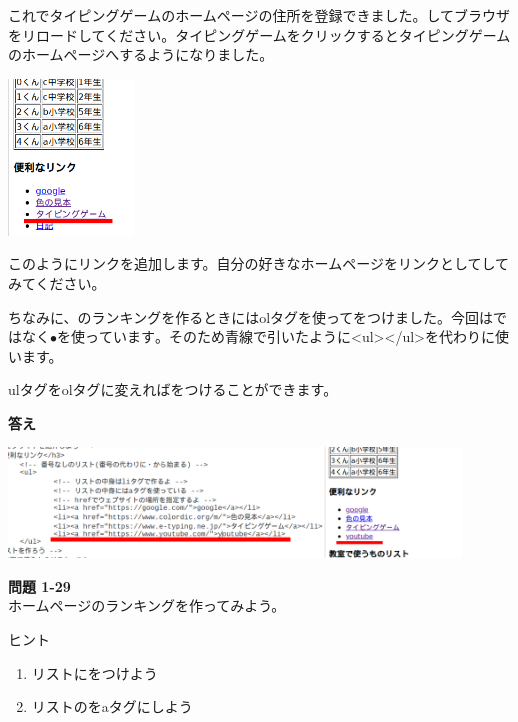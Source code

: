 \bigskip
\flushleft

これでタイピングゲームのホームページの住所を登録できました。してブラウザをリロードしてください。タイピングゲームをクリックするとタイピングゲームのホームページへするようになりました。


\bigskip
\centering
\includegraphics[width=0.25\textwidth]{text01-img/textbook-img201.png}


\flushleft
このようにリンクを追加します。自分の好きなホームページをリンクとしてしてみてください。

ちなみに、のランキングを作るときにはolタグを使ってをつけました。今回はではなく${\bullet}を使っています。そのため青線で引いたように${\textless}ul{\textgreater}{\textless}/ul{\textgreater}を代わりに使います。

ulタグをolタグに変えればをつけることができます。


\bigskip

\textbf{答え}

\centering
\includegraphics[width=0.9\textwidth]{text01-img/textbook-img202.png}

\flushleft
\noindent \textbf{問題 1-29}\\
ホームページのランキングを作ってみよう。

ヒント

\begin{enumerate}
  \item リストにをつけよう
  \item リストのをaタグにしよう
\end{enumerate}

